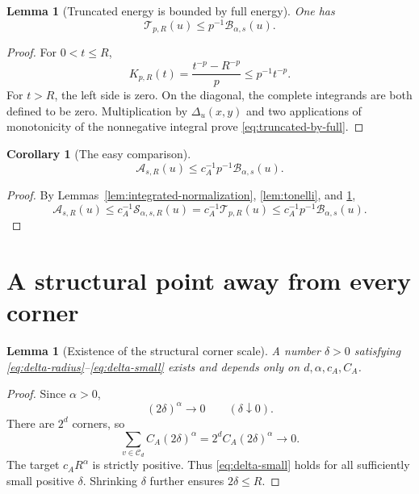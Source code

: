 \documentclass[11pt]{article}
\newtheorem{lemma}[theorem]{Lemma}
\newtheorem{corollary}[theorem]{Corollary}
\theoremstyle{remark}
\newcommand{\Aenergy}{\mathcal A}
\newcommand{\Senergy}{\mathcal S}
\newcommand{\Tenergy}{\mathcal T}
\newcommand{\Benergy}{\mathcal B}
\newcommand{\Corners}{\mathcal C_d}
\begin{document}
\begin{lemma}[Truncated energy is bounded by full energy]                  \label{lem:truncated-by-full}
One has
\begin{equation}
  \Tenergy_{p,R}(u)
  \leq
  p^{-1}\Benergy_{\alpha,s}(u).                                          \label{eq:truncated-by-full}
\end{equation}
\end{lemma}

\begin{proof}
For \(0<t\leq R\),
\[
  K_{p,R}(t)
  =
  \frac{t^{-p}-R^{-p}}p
  \leq
  p^{-1}t^{-p}.
\]
For \(t>R\), the left side is zero.  On the diagonal, the complete
integrands are both defined to be zero.  Multiplication by
\(\Delta_u(x,y)\) and two applications of monotonicity of the nonnegative
integral prove \eqref{eq:truncated-by-full}.
\end{proof}

\begin{corollary}[The easy comparison]                                    \label{cor:easy}
\[
  \Aenergy_{s,R}(u)
  \leq
  c_A^{-1}p^{-1}\Benergy_{\alpha,s}(u).
\]
\end{corollary}

\begin{proof}
By Lemmas~\ref{lem:integrated-normalization},
\ref{lem:tonelli}, and \ref{lem:truncated-by-full},
\[
  \Aenergy_{s,R}(u)
  \leq
  c_A^{-1}\Senergy_{\alpha,s,R}(u)
  =
  c_A^{-1}\Tenergy_{p,R}(u)
  \leq
  c_A^{-1}p^{-1}\Benergy_{\alpha,s}(u).
\]
\end{proof}

\section{A structural point away from every corner}

\begin{lemma}[Existence of the structural corner scale]                   \label{lem:corner-scale}
A number \(\delta>0\) satisfying
\eqref{eq:delta-radius}--\eqref{eq:delta-small} exists and depends only on
\(d,\alpha,c_A,C_A\).
\end{lemma}

\begin{proof}
Since \(\alpha>0\),
\[
  (2\delta)^\alpha\longrightarrow0
  \qquad(\delta\downarrow0).
\]
There are \(2^d\) corners, so
\[
  \sum_{v\in\Corners}C_A(2\delta)^\alpha
  =
  2^d C_A(2\delta)^\alpha
  \longrightarrow0.
\]
The target \(c_A R^\alpha\) is strictly positive.  Thus
\eqref{eq:delta-small} holds for all sufficiently small positive
\(\delta\).  Shrinking \(\delta\) further ensures \(2\delta\leq R\).
\end{proof}
\end{document}
